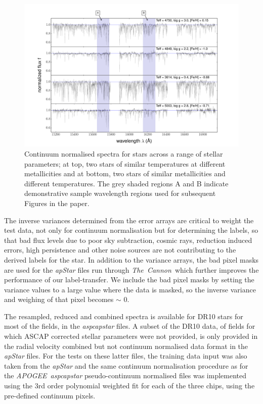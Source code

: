 \documentclass[12pt, preprint]{aastex}
\newcommand{\tc}{\textsl{The~Cannon}}
\newcommand{\apogee}{\textsl{APOGEE}}
\begin{document}
\begin{figure}[h!]
  \includegraphics[width=\hsize]{./plots/four_examples3.pdf}
\caption{Continuum normalised spectra for stars across a range of stellar parameters; at top, two stars of similar temperatures at different metallicities and at bottom, two stars of similar metallicities and different temperatures. The grey shaded regions A and B indicate demonstrative sample wavelength regions used for subsequent Figures in the paper.}
\label{fig:norm}
\end{figure}


The inverse variances determined from the error arrays are critical to weight the test data, not only for continuum normalisation but for determining the labels, so that bad flux levels due to poor sky subtraction, cosmic rays, reduction induced errors, high persistence and other noise sources are not contributing to the derived labels for the star. In addition to the variance arrays, the bad pixel masks are used for the \textit{apStar} files run through \tc\, which further improves the performance of our label-transfer. We include the bad pixel masks by setting the variance values to a large value where the data is masked, so the inverse variance and weighing of that pixel becomes $\sim$ 0. 

The resampled, reduced and combined spectra is available for DR10 stars for most of the fields, in the \textit{aspcapstar} files. A subset of the DR10 data, of fields for which ASCAP corrected stellar parameters were not provided, is only provided in the radial velocity combined but not continuum normalised data format in the \textit{apStar} files. For the tests on these latter files, the training data input was also taken from the \textit{apStar} and the same continuum normalisation procedure as for the \apogee\ \textit{aspcapstar} pseudo-continuum normalised files was implemented using the 3rd order polynomial weighted fit for each of the three chips, using the pre-defined continuum pixels.
\end{document}
